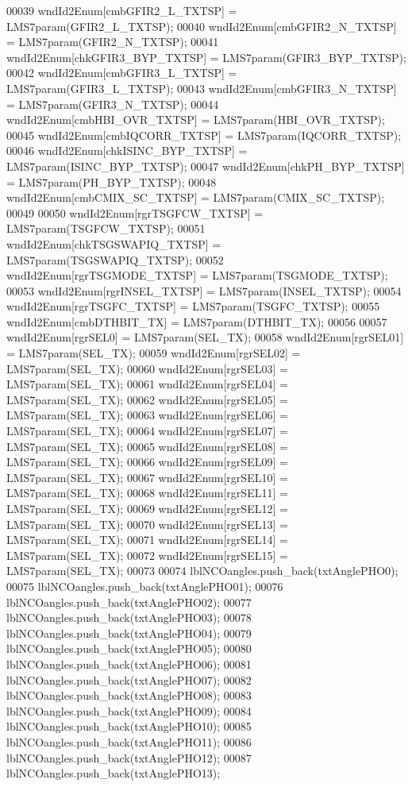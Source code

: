 \begin{DoxyCode}
00039     wndId2Enum[cmbGFIR2_L_TXTSP] = LMS7param(GFIR2_L_TXTSP);
00040     wndId2Enum[cmbGFIR2_N_TXTSP] = LMS7param(GFIR2_N_TXTSP);
00041     wndId2Enum[chkGFIR3_BYP_TXTSP] = LMS7param(GFIR3_BYP_TXTSP);
00042     wndId2Enum[cmbGFIR3_L_TXTSP] = LMS7param(GFIR3_L_TXTSP);
00043     wndId2Enum[cmbGFIR3_N_TXTSP] = LMS7param(GFIR3_N_TXTSP);
00044     wndId2Enum[cmbHBI_OVR_TXTSP] = LMS7param(HBI_OVR_TXTSP);
00045     wndId2Enum[cmbIQCORR_TXTSP] = LMS7param(IQCORR_TXTSP);
00046     wndId2Enum[chkISINC_BYP_TXTSP] = LMS7param(ISINC_BYP_TXTSP);
00047     wndId2Enum[chkPH_BYP_TXTSP] = LMS7param(PH_BYP_TXTSP);
00048     wndId2Enum[cmbCMIX_SC_TXTSP] = LMS7param(CMIX_SC_TXTSP);
00049 
00050     wndId2Enum[rgrTSGFCW_TXTSP] = LMS7param(TSGFCW_TXTSP);
00051     wndId2Enum[chkTSGSWAPIQ_TXTSP] = LMS7param(TSGSWAPIQ_TXTSP);
00052     wndId2Enum[rgrTSGMODE_TXTSP] = LMS7param(TSGMODE_TXTSP);
00053     wndId2Enum[rgrINSEL_TXTSP] = LMS7param(INSEL_TXTSP);
00054     wndId2Enum[rgrTSGFC_TXTSP] = LMS7param(TSGFC_TXTSP);
00055     wndId2Enum[cmbDTHBIT_TX] = LMS7param(DTHBIT_TX);
00056 
00057     wndId2Enum[rgrSEL0] = LMS7param(SEL_TX);
00058     wndId2Enum[rgrSEL01] = LMS7param(SEL_TX);
00059     wndId2Enum[rgrSEL02] = LMS7param(SEL_TX);
00060     wndId2Enum[rgrSEL03] = LMS7param(SEL_TX);
00061     wndId2Enum[rgrSEL04] = LMS7param(SEL_TX);
00062     wndId2Enum[rgrSEL05] = LMS7param(SEL_TX);
00063     wndId2Enum[rgrSEL06] = LMS7param(SEL_TX);
00064     wndId2Enum[rgrSEL07] = LMS7param(SEL_TX);
00065     wndId2Enum[rgrSEL08] = LMS7param(SEL_TX);
00066     wndId2Enum[rgrSEL09] = LMS7param(SEL_TX);
00067     wndId2Enum[rgrSEL10] = LMS7param(SEL_TX);
00068     wndId2Enum[rgrSEL11] = LMS7param(SEL_TX);
00069     wndId2Enum[rgrSEL12] = LMS7param(SEL_TX);
00070     wndId2Enum[rgrSEL13] = LMS7param(SEL_TX);
00071     wndId2Enum[rgrSEL14] = LMS7param(SEL_TX);
00072     wndId2Enum[rgrSEL15] = LMS7param(SEL_TX);
00073 
00074     lblNCOangles.push\_back(txtAnglePHO0);
00075     lblNCOangles.push\_back(txtAnglePHO01);
00076     lblNCOangles.push\_back(txtAnglePHO02);
00077     lblNCOangles.push\_back(txtAnglePHO03);
00078     lblNCOangles.push\_back(txtAnglePHO04);
00079     lblNCOangles.push\_back(txtAnglePHO05);
00080     lblNCOangles.push\_back(txtAnglePHO06);
00081     lblNCOangles.push\_back(txtAnglePHO07);
00082     lblNCOangles.push\_back(txtAnglePHO08);
00083     lblNCOangles.push\_back(txtAnglePHO09);
00084     lblNCOangles.push\_back(txtAnglePHO10);
00085     lblNCOangles.push\_back(txtAnglePHO11);
00086     lblNCOangles.push\_back(txtAnglePHO12);
00087     lblNCOangles.push\_back(txtAnglePHO13);

\end{DoxyCode}
